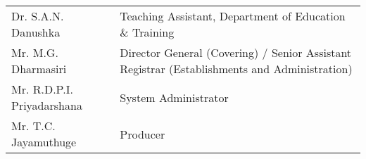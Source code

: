 \begin{longtable}{ L{4.8cm}  L{6.5cm} }
    Dr. S.A.N. Danushka & Teaching Assistant, Department of Education \& Training \\
    Mr. M.G. Dharmasiri & Director General (Covering) / Senior Assistant Registrar (Establishments and Administration) \\
    Mr. R.D.P.I. Priyadarshana & System Administrator \\
    Mr. T.C. Jayamuthuge & Producer \\
\end{longtable}



\newpage
\singlespacing